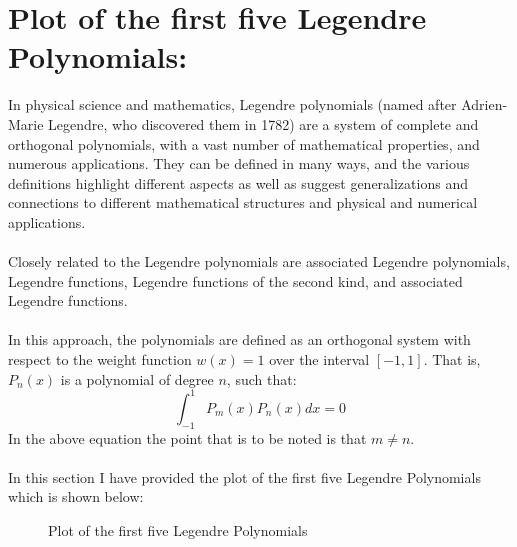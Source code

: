 \documentclass[12pt,a4paper]{article}
\begin{document}
\section{Plot of the first five Legendre Polynomials:}
In physical science and mathematics, Legendre polynomials (named after Adrien-Marie Legendre, who discovered them in 1782) are a system of complete and orthogonal polynomials, with a vast number of mathematical properties, and numerous applications. They can be defined in many ways, and the various definitions highlight different aspects as well as suggest generalizations and connections to different mathematical structures and physical and numerical applications.\\
\\Closely related to the Legendre polynomials are associated Legendre polynomials, Legendre functions, Legendre functions of the second kind, and associated Legendre functions.\\
\\In this approach, the polynomials are defined as an orthogonal system with respect to the weight function $w(x) = 1$ over the interval $[-1, 1]$. That is, $P_n(x)$ is a polynomial of degree $n$, such that:
\begin{equation}
    \int_{-1}^{1}{\text{$P_m$}(x) \text{$P_n$}(x) \text{$dx$}} = \text{0}
\end{equation}
In the above equation the point that is to be noted is that $m \neq n$.\\
\\In this section I have provided the plot of the first five Legendre Polynomials which is shown below:
\begin{figure}[!ht]
	\begin{center}
	\end{center}
	\caption{Plot of the first five Legendre Polynomials}
\end{figure}
\clearpage
\end{document}
